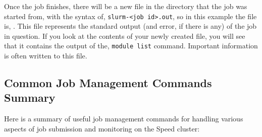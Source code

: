 Once the job finishes, there will be a new file in the directory that the job 
was started from, with the syntax of, \texttt{slurm-<job id>.out}, so 
in this example the file is, . This file represents the 
standard output (and error, if there is any) of the job in question. If you 
look at the contents of your newly created file, you will see that it 
contains the output of the, \texttt{module list} command. 
Important information is often written to this file.
%

\subsection{Common Job Management Commands Summary}
\label{sect:job-management-commands}

Here is a summary of useful job management commands for handling various aspects of 
job submission and monitoring on the Speed cluster:

